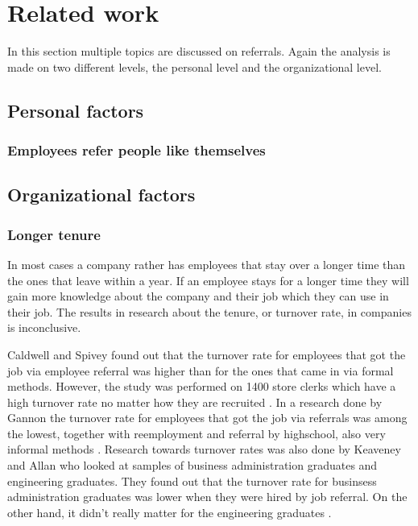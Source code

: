 \documentclass[a4paper, 11pt]{article} %
\begin{document}
\section*{Related work}
In this section multiple topics are discussed on referrals. Again the analysis is made on two different levels, the personal level and the organizational level. 

\subsection*{Personal factors}

\subsubsection*{Employees refer people like themselves}\label{refer}

\subsection*{Organizational factors}

\subsubsection*{Longer tenure}
In most cases a company rather has employees that stay over a longer time than the ones that leave within a year. If an employee stays for a longer time they will gain more knowledge about the company and their job which they can use in their job. 
The results in research about the tenure, or turnover rate, in companies is inconclusive.

Caldwell and Spivey found out that the turnover rate for employees that got the job via employee referral was higher than for the ones that came in via formal methods. However, the study was performed on 1400 store clerks which have a high turnover rate no matter how they are recruited \cite{second}. In a research done by Gannon the turnover rate for employees that got the job via referrals was among the lowest, together with reemployment and referral by highschool, also very informal methods \cite{seventh}.
Research towards turnover rates was also done by Keaveney and Allan who looked at samples of business administration graduates and engineering graduates. They found out that the turnover rate for businsess administration graduates was lower when they were hired by job referral. On the other hand, it didn't really matter for the engineering graduates \cite{eleventh}.
\end{document}
